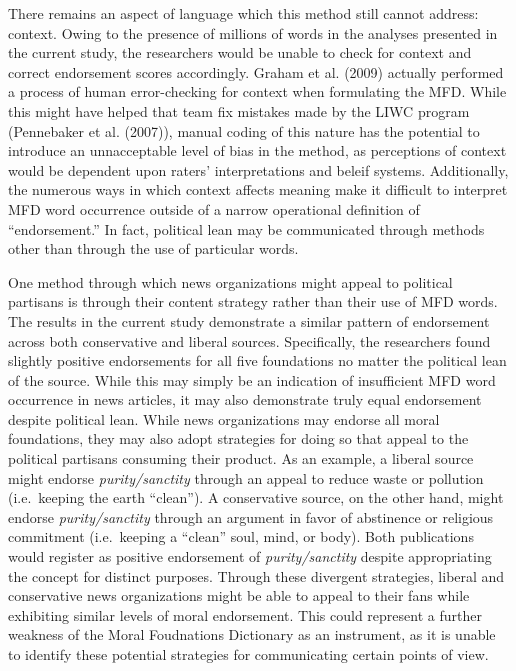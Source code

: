 \documentclass[english,,man]{apa6}
\begin{document}
There remains an aspect of language which this method still cannot
address: context. Owing to the presence of millions of words in the
analyses presented in the current study, the researchers would be unable
to check for context and correct endorsement scores accordingly. Graham
et al. (2009) actually performed a process of human error-checking for
context when formulating the MFD. While this might have helped that team
fix mistakes made by the LIWC program (Pennebaker et al. (2007)), manual
coding of this nature has the potential to introduce an unnacceptable
level of bias in the method, as perceptions of context would be
dependent upon raters' interpretations and beleif systems. Additionally,
the numerous ways in which context affects meaning make it difficult to
interpret MFD word occurrence outside of a narrow operational definition
of \enquote{endorsement.} In fact, political lean may be communicated
through methods other than through the use of particular words.

One method through which news organizations might appeal to political
partisans is through their content strategy rather than their use of MFD
words. The results in the current study demonstrate a similar pattern of
endorsement across both conservative and liberal sources. Specifically,
the researchers found slightly positive endorsements for all five
foundations no matter the political lean of the source. While this may
simply be an indication of insufficient MFD word occurrence in news
articles, it may also demonstrate truly equal endorsement despite
political lean. While news organizations may endorse all moral
foundations, they may also adopt strategies for doing so that appeal to
the political partisans consuming their product. As an example, a
liberal source might endorse \emph{purity/sanctity} through an appeal to
reduce waste or pollution (i.e.~keeping the earth \enquote{clean}). A
conservative source, on the other hand, might endorse
\emph{purity/sanctity} through an argument in favor of abstinence or
religious commitment (i.e.~keeping a \enquote{clean} soul, mind, or
body). Both publications would register as positive endorsement of
\emph{purity/sanctity} despite appropriating the concept for distinct
purposes. Through these divergent strategies, liberal and conservative
news organizations might be able to appeal to their fans while
exhibiting similar levels of moral endorsement. This could represent a
further weakness of the Moral Foudnations Dictionary as an instrument,
as it is unable to identify these potential strategies for communicating
certain points of view.
\end{document}
